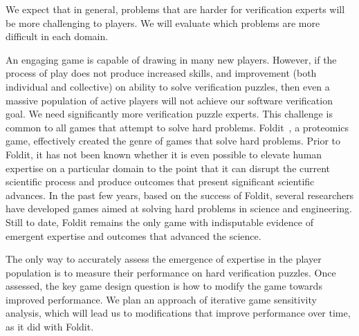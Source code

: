 \documentclass{sig-alternate}
\begin{document}
We expect that in general, problems that are harder for verification
experts will be more challenging to players.  We will evaluate which
problems are more difficult in each domain.

An engaging game is capable of drawing in many new
players.  However, if the process of play does not produce increased
skills, and improvement (both individual and collective) on ability to
solve verification puzzles, then even a massive population of active
players will not achieve our software verification goal.
We need significantly more verification puzzle experts.
This challenge is common to all games
that attempt to solve hard problems.
Foldit~\cite{cooper10predicting,cooper10challenge,cooper11analysis,cooper11phd},
a proteomics game,
effectively created the genre of games that solve hard problems.
Prior to Foldit, it has not been known whether it is even possible to
elevate human expertise on a particular domain to the point that it
can disrupt the current scientific process and produce outcomes that
present significant scientific advances.  In the past few years, based
on the success of Foldit, several researchers have developed games
aimed at solving hard problems in science and engineering.  Still to
date, Foldit remains the only game with indisputable evidence
of emergent expertise and outcomes that advanced the science.

The only way to accurately assess the emergence of expertise in the
player population is to measure their performance on hard verification
puzzles.  Once assessed, the key game design question is how to modify
the game towards improved performance.  We plan an approach of iterative
game sensitivity analysis, which will lead us to modifications that improve
performance over time, as it did with Foldit.
 
 
% 
% 
% 
\end{document}

